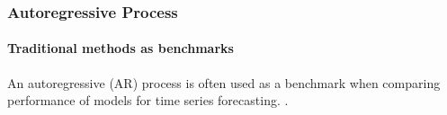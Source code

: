 \begin{frame}
    \frametitle{Autoregressive Process}
    \framesubtitle{Traditional methods as benchmarks}

    \begin{center}
        An autoregressive (AR) process is often used as a benchmark when comparing performance of models for time series forecasting. \parencite{cambamendez_automatic_2001,barnett_real-time_2016,Richardson_et_al,makridakis_statistical_2018,kapetanios_investigating_2022,kurihara_ar_2019}.
    \end{center}
\end{frame}